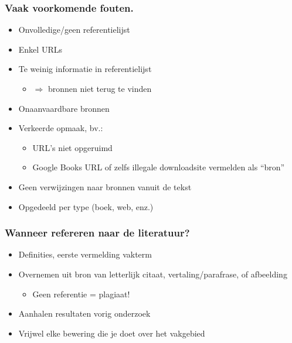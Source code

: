 \documentclass[aspectratio=169]{beamer}
\begin{document}
\begin{frame}
  \frametitle{Vaak voorkomende fouten.}

  \begin{itemize}
    \item Onvolledige/geen referentielijst
    \item Enkel URLs
    \item Te weinig informatie in referentielijst
          \begin{itemize}
            \item \(\Rightarrow\) bronnen niet terug te vinden
          \end{itemize}
    \item Onaanvaardbare bronnen
    \item Verkeerde opmaak, bv.:
          \begin{itemize}
            \item URL's niet opgeruimd
            \item Google Books URL of zelfs illegale downloadsite vermelden als ``bron''
          \end{itemize}
    \item Geen verwijzingen naar bronnen vanuit de tekst
    \item Opgedeeld per type (boek, web, enz.)
  \end{itemize}
\end{frame}

\begin{frame}
  \frametitle{Wanneer refereren naar de literatuur?}

  \begin{itemize}
    \item Definities, eerste vermelding vakterm
    \item Overnemen uit bron van letterlijk citaat, vertaling/parafrase, of afbeelding
          \begin{itemize}
            \item Geen referentie = \alert{plagiaat!}
          \end{itemize}
    \item Aanhalen resultaten vorig onderzoek
    \item Vrijwel elke bewering die je doet over het vakgebied
  \end{itemize}

  \bigskip

\end{frame}
\end{document}

